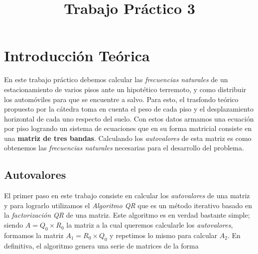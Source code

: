 \documentclass[a4paper]{article}
\title{Trabajo Práctico 3}
\begin{document}

\resumen{}

\maketitle

\newpage

\tableofcontents


\newpage

\section{Introducción Teórica}


En este trabajo práctico debemos calcular las \textit{frecuencias naturales} de un estacionamiento de varios pisos ante un hipotético terremoto, y como distribuir los automóviles para que se encuentre a salvo. Para esto, el trasfondo teórico propuesto por la cátedra toma en cuenta el peso de cada piso y el desplazamiento horizontal de cada uno respecto del suelo. Con estos datos armamos una ecuación por piso logrando un sistema de ecuaciones que en su forma matricial consiste en una \textbf{matriz de tres bandas}. Calculando los \textit{autovalores} de esta matriz es como obtenemos las \textit{frecuencias naturales} necesarias para el desarrollo del problema.

\subsection{Autovalores}
El primer paso en este trabajo consiste en calcular los \textit{autovalores} de una matriz y para lograrlo utilizamos el \textit{Algoritmo QR} que es un método iterativo basado en la \textit{factorización QR} de una matriz. Este algoritmo es en verdad bastante simple; siendo $A = Q_0 \times R_0$ la matriz a la cual queremos calcularle los \textit{autovalores}, formamos la matriz $A_1 = R_0 \times Q_0$ y repetimos lo mismo para calcular $A_2$. En definitiva, el algoritmo genera una serie de matrices de la forma
\end{document}
